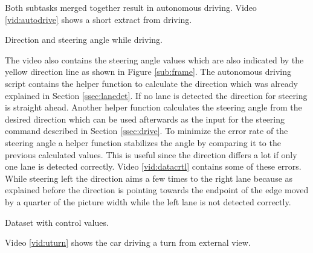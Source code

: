 \documentclass[conference]{IEEEtran}
\begin{document}
Both subtasks merged together result in autonomous driving.
Video \ref{vid:autodrive} shows a short extract from driving.

\begin{video}[h]
	\caption{Direction and steering angle while driving.}
	\label{vid:autodrive}
	\centering
\end{video}

The video also contains the steering angle values which are also indicated by the yellow direction line as shown in Figure \ref{sub:frame}.
The autonomous driving script contains the helper function to calculate the direction which was already explained in Section \ref{ssec:lanedet}.
If no lane is detected the direction for steering is straight ahead.
Another helper function calculates the steering angle from the desired direction which can be used afterwards as the input for the steering command described in Section \ref{ssec:drive}.
To minimize the error rate of the steering angle a helper function stabilizes the angle by comparing it to the previous calculated values.
This is useful since the direction differs a lot if only one lane is detected correctly.
Video \ref{vid:datacrtl} contains some of these errors.
While steering left the direction aims a few times to the right lane because as explained before the direction is pointing towards the endpoint of the edge moved by a quarter of the picture width while the left lane is not detected correctly.

\begin{video}[h]
	\caption{Dataset with control values.}
	\label{vid:datacrtl}
	\centering
\end{video}

Video \ref{vid:uturn} shows the car driving a turn from external view.
\end{document}
